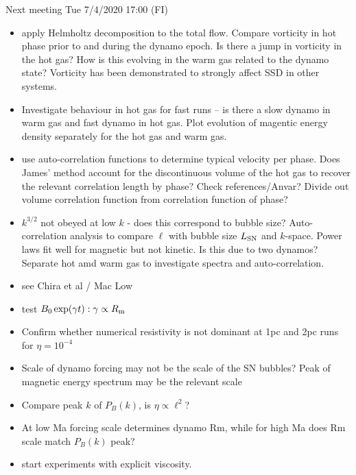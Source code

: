 \documentclass[iop,apj,numberedappendix,twocolappendix]{emulateapj}
\begin{document}
Next meeting Tue 7/4/2020 17:00 (FI)
\begin{itemize} 
\item apply Helmholtz decomposition to the total flow. Compare vorticity in hot
phase prior to and during the dynamo epoch. Is there a jump in vorticity in the
hot gas? How is this evolving in the warm gas related to the dynamo state? 
Vorticity has been demonstrated to strongly affect SSD in other systems.
\item Investigate behaviour in hot gas for fast runs -- is there a slow
dynamo in warm gas and fast dynamo in hot gas. Plot evolution of magentic energy
density separately for the hot gas and warm gas.
\item use auto-correlation functions to determine typical velocity per phase.
Does James' method account for the discontinuous volume of the hot gas to
recover the relevant correlation length by phase? Check references/Anvar?
Divide out volume correlation function from correlation function of phase?
\item $k^{3/2}$ not obeyed at low $k$ - does this correspond to bubble size?
Auto-correlation analysis to compare $\ell$ with bubble size $L_{\rm SN}$
and $k$-space.
Power laws fit well for magnetic but not kinetic.
Is this due to two dynamos?
Separate hot amd warm gas to investigate spectra and auto-correlation.
\item see Chira et al / Mac Low
\item test $B_0\exp(\gamma t): \gamma\propto R_{\rm m}$
\item Confirm whether numerical resistivity is not dominant at 1pc and 2pc runs for $\eta=10^{-4}$
\item Scale of dynamo forcing may not be the scale of the SN bubbles? Peak of magnetic energy spectrum may be the relevant scale
\item Compare peak $k$ of $P_B(k)$, is $\eta\propto\ell^2$?
\item At low Ma forcing scale determines dynamo Rm, while for high Ma does
Rm scale match $P_B(k)$ peak?
\item start experiments with explicit viscosity.
\end{itemize} 
\end{document}
